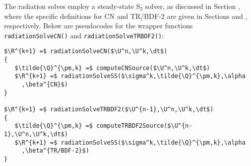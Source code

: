 The radiation solves employ a steady-state S$_2$ solver, as discussed
in Section , where the specific definitions for
CN and TR/BDF-2 are given in Sections  and ,
respectively. Below are pseudocodes for the wrapper functions
\texttt{radiationSolveCN()} and \texttt{radiationSolveTRBDF2()}:

\begin{lstlisting}[mathescape,columns=fullflexible,
   basicstyle=\fontfamily{lmvtt}\selectfont]
$\R^{k+1} =$ radiationSolveCN($\U^n,\U^k,\dt$)
{
   $\tilde{\Q}^{\pm,k} =$ computeCNSource($\U^n,\U^k,\dt$)
   $\R^{k+1} =$ radiationSolveSS($\sigma^k,\tilde{\Q}^{\pm,k},\alpha
     ,\beta^{CN}$)
}

$\R^{k+1} =$ radiationSolveTRBDF2($\U^{n-1},\U^n,\U^k,\dt$)
{
   $\tilde{\Q}^{\pm,k} =$ computeTRBDF2Source($\U^{n-1},\U^n,\U^k,\dt$)
   $\R^{k+1} =$ radiationSolveSS($\sigma^k,\tilde{\Q}^{\pm,k},\alpha
     ,\beta^{TR/BDF-2}$)
}
\end{lstlisting}


